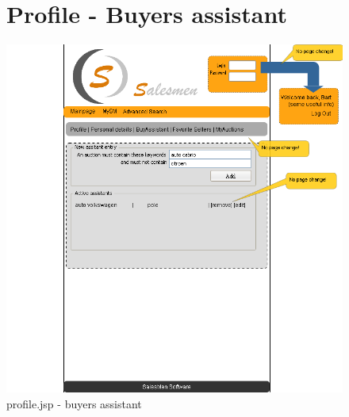 \documentclass[salesmen, twoside]{../../../templates/latex/2009/softproj}
\begin{document}
\begin{projdoc}
\begin{figure}
\section{Profile - Buyers assistant}
\label{fig_prototype_buyer_assistant}
\includegraphics[width=15cm]{../../img/SM_mySM_buy_assistant.png}
\caption{profile.jsp - buyers assistant}
\end{figure}
\begin{figure}

\end{figure}
\end{projdoc}
\end{document}
